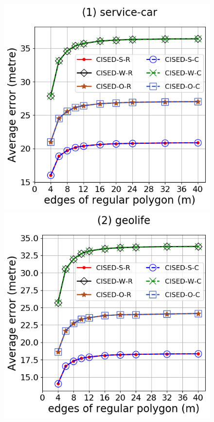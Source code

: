 \begin{figure}[tb!]
\centering
\includegraphics[scale = 0.30]{Figures/Exp-M-e-60-error-service.png}
\includegraphics[scale = 0.30]{Figures/Exp-M-e-60-error-geolife.png}

\end{figure}
